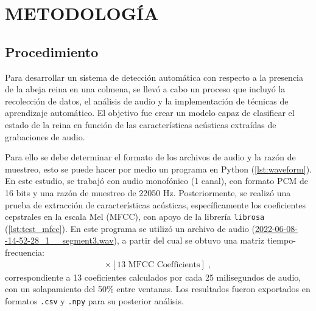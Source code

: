 \documentclass[12pt]{report}
\newenvironment{tightmulticols}{%
  \begin{multicols}{2}
  \setlength{\parskip}{0pt}
  \setlength{\parindent}{0em}
  \linespread{1}\selectfont
}{%
  \end{multicols}
}
\begin{document}
\pagebreak
\chapter{METODOLOGÍA}
\vspace{-3em}

\begin{tightmulticols}

\section{Procedimiento}

\par Para desarrollar un sistema de detección automática con respecto a la presencia de la abeja reina en una colmena, se llevó a cabo un proceso que incluyó la recolección de datos, el análisis de audio y la implementación de técnicas de aprendizaje automático. El objetivo fue crear un modelo capaz de clasificar el estado de la reina en función de las características acústicas extraídas de grabaciones de audio.

\par Para ello se debe determinar el formato de los archivos de audio y la razón de muestreo, esto se puede hacer por medio un programa en Python (\ref{lst:waveform}). En este estudio, se trabajó con audio monofónico (1 canal), con formato PCM de 16 bits y una razón de muestreo de 22050 Hz. Posteriormente, se realizó una prueba de extracción de características acústicas, específicamente los coeficientes cepstrales en la escala Mel (MFCC), con apoyo de la librería \texttt{librosa} (\ref{lst:test_mfcc}). En este programa se utilizó un archivo de audio (\url{2022-06-08--14-52-28_1__segment3.wav}), a partir del cual se obtuvo una matriz tiempo-frecuencia:
\begin{align*}
[\text{Time Frames}] \times [\text{13 MFCC Coefficients}] \; ,
\end{align*}
correspondiente a 13 coeficientes calculados por cada 25 milisegundos de audio, con un solapamiento del 50\% entre ventanas. Los resultados fueron exportados en formatos \texttt{.csv} y \texttt{.npy} para su posterior análisis.


\end{tightmulticols}
\end{document}

